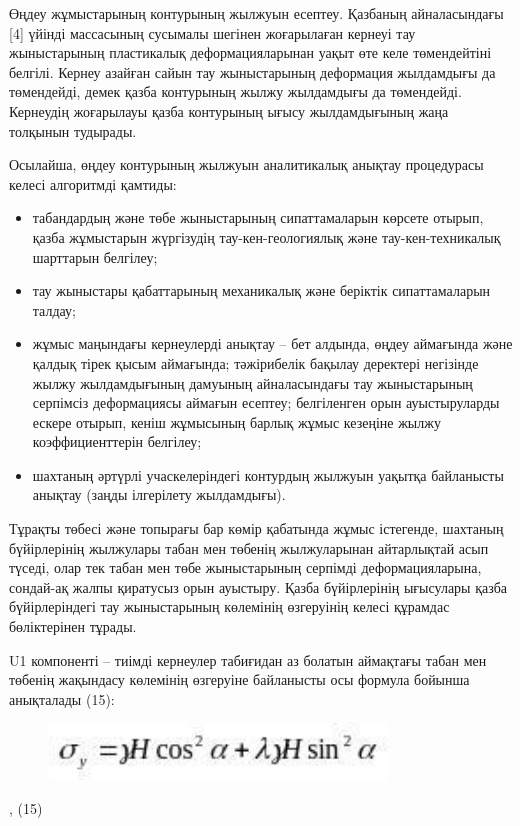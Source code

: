 Өңдеу жұмыстарының контурының жылжуын есептеу. Қазбаның айналасындағы
{[}4{]} үйінді массасының сусымалы шегінен жоғарылаған кернеуі тау
жыныстарының пластикалық деформацияларынан уақыт өте келе төмендейтіні
белгілі. Кернеу азайған сайын тау жыныстарының деформация жылдамдығы да
төмендейді, демек қазба контурының жылжу жылдамдығы да төмендейді.
Кернеудің жоғарылауы қазба контурының ығысу жылдамдығының жаңа толқынын
тудырады.

Осылайша, өңдеу контурының жылжуын аналитикалық анықтау процедурасы
келесі алгоритмді қамтиды:

\begin{itemize}
\item
  табандардың және төбе жыныстарының сипаттамаларын көрсете отырып,
  қазба жұмыстарын жүргізудің тау-кен-геологиялық және
  тау-кен-техникалық шарттарын белгілеу;
\item
  тау жыныстары қабаттарының механикалық және беріктік сипаттамаларын
  талдау;
\item
  жұмыс маңындағы кернеулерді анықтау -- бет алдында, өңдеу аймағында
  және қалдық тірек қысым аймағында; тәжірибелік бақылау деректері
  негізінде жылжу жылдамдығының дамуының айналасындағы тау жыныстарының
  серпімсіз деформациясы аймағын есептеу; белгіленген орын ауыстыруларды
  ескере отырып, кеніш жұмысының барлық жұмыс кезеңіне жылжу
  коэффициенттерін белгілеу;
\item
  шахтаның әртүрлі учаскелеріндегі контурдың жылжуын уақытқа байланысты
  анықтау (заңды ілгерілету жылдамдығы).
\end{itemize}

Тұрақты төбесі және топырағы бар көмір қабатында жұмыс істегенде,
шахтаның бүйірлерінің жылжулары табан мен төбенің жылжуларынан
айтарлықтай асып түседі, олар тек табан мен төбе жыныстарының серпімді
деформацияларына, сондай-ақ жалпы қиратусыз орын ауыстыру. Қазба
бүйірлерінің ығысулары қазба бүйірлеріндегі тау жыныстарының көлемінің
өзгеруінің келесі құрамдас бөліктерінен тұрады.

U1 компоненті -- тиімді кернеулер табиғидан аз болатын аймақтағы табан
мен төбенің жақындасу көлемінің өзгеруіне байланысты осы формула бойынша
анықталады (15):

\begin{figure}[H]
	\centering
	\includegraphics[width=0.8\textwidth]{assets/1311}
	\caption*{}
\end{figure}, (15)

